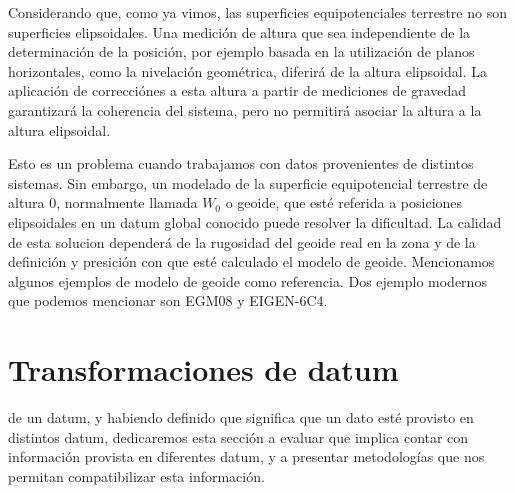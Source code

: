 \documentclass{tufte-book}
\begin{document}
Considerando que, como ya vimos, las superficies equipotenciales terrestre no
son superficies elipsoidales. Una medición de altura que sea independiente de la determinación
de la posición, por ejemplo basada en la utilización de planos horizontales, como la nivelación
geométrica, diferirá de la altura elipsoidal. La aplicación de correcciónes a esta altura
a partir de mediciones de gravedad garantizará la coherencia del sistema, pero no
permitirá asociar la altura a la altura elipsoidal.

Esto es un problema cuando trabajamos con datos provenientes de distintos sistemas. Sin embargo,
un modelado de la superficie equipotencial terrestre de altura 0, normalmente llamada \(W_0\) o
geoide, que esté referida a posiciones elipsoidales en un datum global conocido
puede resolver la dificultad. La calidad de esta solucion dependerá de la rugosidad del
geoide real en la zona y de la definición y presición con que esté calculado el modelo
de geoide. Mencionamos algunos ejemplos de modelo de geoide como referencia. Dos ejemplo modernos
que podemos mencionar son EGM08 y EIGEN-6C4.

\section{Transformaciones de datum}

 de un datum, y habiendo definido
que significa que un dato esté provisto en distintos datum, dedicaremos esta sección
a evaluar que implica contar con información provista en diferentes datum, y a presentar
metodologías que nos permitan compatibilizar esta información.
\end{document}
